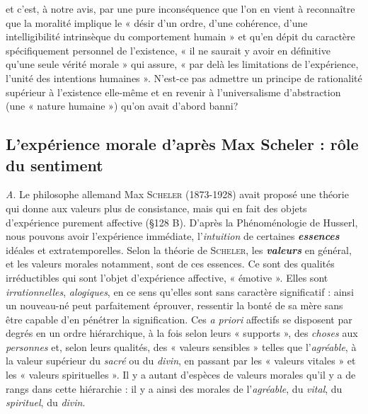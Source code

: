 et c’est, à notre
avis, par une pure inconséquence que l’on en vient à reconnaître que
la moralité implique le « désir d’un ordre, d’une cohérence, d’une
intelligibilité intrinsèque du comportement humain » et qu’en dépit
du caractère spécifiquement personnel de l'existence, « il ne saurait
y avoir en définitive qu’une seule vérité morale » qui assure, « par
delà les limitations de l'expérience, l’unité des intentions humaines ».
N'est-ce pas admettre un principe de rationalité supérieur à l’existence
elle-même et en revenir à l’universalisme d’abstraction (une
« nature humaine ») qu’on avait d’abord banni?

\subsection{L'expérience morale d’après Max Scheler : rôle du sentiment}%
{\it A}. Le philosophe allemand Max \textsc{Scheler} (1873-1928)
avait proposé une théorie qui donne aux valeurs plus de consistance,
mais qui en fait des objets d'expérience purement affective (\S 128 B).
D’après la Phénoménologie de Husserl, nous pouvons avoir l’expérience
immédiate, l’{\it intuition} de certaines \textbf{\textit {essences}} idéales et extratemporelles.
Selon la théorie de \textsc{Scheler}, les \textbf{\textit {valeurs}} en général,
et les valeurs morales notamment, sont de ces essences. Ce sont
des qualités irréductibles qui sont l’objet d’expérience affective,
« émotive ». Elles sont {\it irrationnelles}, {\it alogiques}, en ce sens qu’elles
sont sans caractère significatif : ainsi un nouveau-né peut parfaitement
éprouver, ressentir la bonté de sa mère sans être capable d’en
pénétrer la signification. Ces {\it a priori} affectifs se disposent par degrés
en un ordre hiérarchique, à la fois selon leurs « supports », des {\it choses}
aux {\it personnes} et, selon leurs qualités, des « valeurs sensibles » telles
que l’{\it agréable}, à la valeur supérieur du {\it sacré} ou du {\it divin}, en passant
par les « valeurs vitales » et les « valeurs spirituelles ». Il y a autant
d’espèces de valeurs morales qu’il y a de rangs dans cette hiérarchie :
il y a ainsi des morales de l’{\it agréable}, du {\it vital}, du {\it spirituel}, du {\it divin}.

